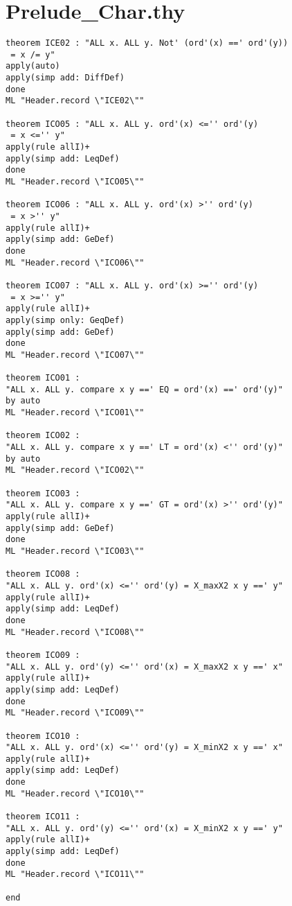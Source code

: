 \section{Prelude\_Char.thy}
\label{appendix:strictProofs:Char}
\begin{multicols}{2}
\tiny
\begin{Verbatim}
theorem ICE02 : "ALL x. ALL y. Not' (ord'(x) ==' ord'(y))
 = x /= y"
apply(auto)
apply(simp add: DiffDef)
done
ML "Header.record \"ICE02\""

theorem ICO05 : "ALL x. ALL y. ord'(x) <='' ord'(y)
 = x <='' y"
apply(rule allI)+
apply(simp add: LeqDef)
done 
ML "Header.record \"ICO05\""

theorem ICO06 : "ALL x. ALL y. ord'(x) >'' ord'(y)
 = x >'' y"
apply(rule allI)+
apply(simp add: GeDef)
done 
ML "Header.record \"ICO06\""

theorem ICO07 : "ALL x. ALL y. ord'(x) >='' ord'(y)
 = x >='' y"
apply(rule allI)+
apply(simp only: GeqDef)
apply(simp add: GeDef)
done 
ML "Header.record \"ICO07\""

theorem ICO01 :
"ALL x. ALL y. compare x y ==' EQ = ord'(x) ==' ord'(y)"
by auto
ML "Header.record \"ICO01\""

theorem ICO02 :
"ALL x. ALL y. compare x y ==' LT = ord'(x) <'' ord'(y)"
by auto
ML "Header.record \"ICO02\""

theorem ICO03 :
"ALL x. ALL y. compare x y ==' GT = ord'(x) >'' ord'(y)"
apply(rule allI)+
apply(simp add: GeDef)
done
ML "Header.record \"ICO03\""

theorem ICO08 :
"ALL x. ALL y. ord'(x) <='' ord'(y) = X_maxX2 x y ==' y"
apply(rule allI)+
apply(simp add: LeqDef)
done
ML "Header.record \"ICO08\""

theorem ICO09 :
"ALL x. ALL y. ord'(y) <='' ord'(x) = X_maxX2 x y ==' x"
apply(rule allI)+
apply(simp add: LeqDef)
done
ML "Header.record \"ICO09\""

theorem ICO10 :
"ALL x. ALL y. ord'(x) <='' ord'(y) = X_minX2 x y ==' x"
apply(rule allI)+
apply(simp add: LeqDef)
done 
ML "Header.record \"ICO10\""

theorem ICO11 :
"ALL x. ALL y. ord'(y) <='' ord'(x) = X_minX2 x y ==' y"
apply(rule allI)+
apply(simp add: LeqDef)
done 
ML "Header.record \"ICO11\""

end
\end{Verbatim}
\end{multicols}

